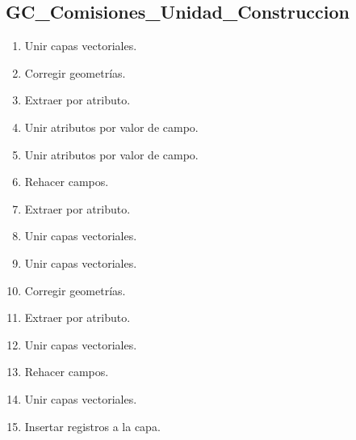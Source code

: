 \documentclass[letterpaper,10pt,spanish]{sphinxmanual}
\begin{document}
\subsection{GC\_Comisiones\_Unidad\_Construccion}
\label{\detokenize{ETL_Cobol/Model:gc-comisiones-unidad-construccion}}\begin{enumerate}
%
\item {} 
Unir capas vectoriales.

\item {} 
Corregir geometrías.

\item {} 
Extraer por atributo.

\item {} 
Unir atributos por valor de campo.

\item {} 
Unir atributos por valor de campo.

\item {} 
Rehacer campos.

\item {} 
Extraer por atributo.

\item {} 
Unir capas vectoriales.

\item {} 
Unir capas vectoriales.

\item {} 
Corregir geometrías.

\item {} 
Extraer por atributo.

\item {} 
Unir capas vectoriales.

\item {} 
Rehacer campos.

\item {} 
Unir capas vectoriales.

\item {} 
Insertar registros a la capa.


\end{enumerate}
\end{document}
